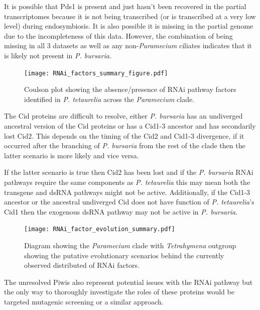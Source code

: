 It is possible that Pds1 is present and just hasn't been recovered 
in the partial transcriptomes because it is not being transcribed (or is 
transcribed at a very low level) during endosymbiosis.  It is also
possible it is missing in the partial genome due to the incompleteness
of this data.  However, the combination of being missing in all 3 datasets
as well as any non-\textit{Paramecium} ciliates indicates that
it is likely not present in \textit{P. bursaria}.

\begin{figure}
    \centering
    \texttt{[image: RNAi\_factors\_summary\_figure.pdf]}
    \caption[Summary of RNAi factors in \textit{Paramecium} species]{Coulson plot
        showing the absence/presence of RNAi pathway factors
    identified in \textit{P. tetaurelia} \citep{Marker2014} across the \textit{Paramecium}
clade.}
    \label{fig:rnai_summary}
\end{figure}

The Cid proteins are difficult to resolve, either \textit{P. bursaria}
has an undiverged ancestral version of the Cid proteins or has a
Cid1-3 ancestor and has secondarily lost Cid2.
This depends on the timing of the Cid2 and Cid1-3 divergence, if
it occurred after the branching of \textit{P. bursaria} from the rest
of the clade then the latter scenario is more likely and vice versa.

If the latter scenario is true then Cid2 has been lost 
and if the \textit{P. bursaria} RNAi
pathways require the same components as \textit{P. tetaurelia} this may
mean both the transgene and dsRNA pathways might not be active. 
Additionally, if the Cid1-3 ancestor or the ancestral undiverged
Cid does not have function of \textit{P. tetaurelia}'s Cid1 then
the exogenous dsRNA pathway may not be active in \textit{P. bursaria}.


\begin{figure}
    \texttt{[image: RNAi\_factor\_evolution\_summary.pdf]}
    \caption[Putative scenario for the evolution of RNAi factors in \textit{Paramecium} species]{
        Diagram showing the \textit{Paramecium} clade with \textit{Tetrahymena} outgroup 
        showing the putative evolutionary scenarios behind the currently
        observed distributed of RNAi factors.
    }
    \label{fig:rnai_evol_summary}
\end{figure}

The unresolved Piwis also represent potential issues with the RNAi pathway
but the only way to thoroughly investigate the roles of these proteins would
be targeted mutagenic screening or a similar approach.

